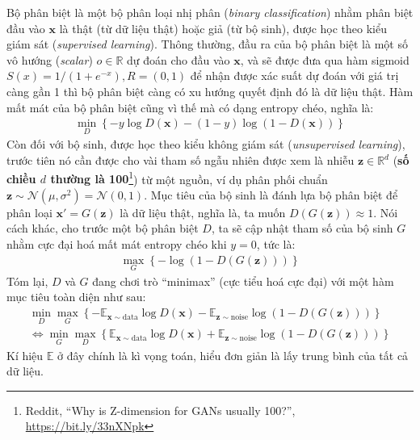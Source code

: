 \documentclass[a4paper]{article}
\begin{document}
\noindent
Bộ phân biệt là một bộ phân loại nhị phân (\textit{binary classification}) nhằm phân biệt đầu vào $\mathbf{x}$ là thật (từ dữ liệu thật) hoặc giả (từ bộ sinh), được học theo kiểu giám sát (\textit{supervised learning}). Thông thường, đầu ra của bộ phân biệt là một số vô hướng (\textit{scalar}) $o \in \mathbb{R}$ dự đoán cho đầu vào $\mathbf{x}$, và sẽ được đưa qua hàm sigmoid $S(x) = 1/(1+e^{-x}), R = (0, 1)$ để nhận được xác suất dự đoán với giá trị càng gần 1 thì bộ phân biệt càng có xu hướng quyết định đó là dữ liệu thật. Hàm mất mát của bộ phân biệt cũng vì thế mà có dạng entropy chéo, nghĩa là:
\begin{align*}
    \min_{D}\left\{-y\log D\left(\mathbf{x}\right) - \left(1-y\right)\log\left(1-D\left(\mathbf{x}\right)\right)\right\}
\end{align*}
Còn đối với bộ sinh, được học theo kiểu không giám sát (\textit{unsupervised learning}), trước tiên nó cần được cho vài tham số ngẫu nhiên được xem là nhiễu $\mathbf{z} \in \mathbb{R}^d$ (\textbf{số chiều $d$ thường là 100}\footnote{Reddit, ``Why is Z-dimension for GANs usually 100?'', \href{https://bit.ly/33nXNpk}{https://bit.ly/33nXNpk}}) từ một nguồn, ví dụ phân phối chuẩn $\mathbf{z} \sim \mathcal{N}\left(\mu, \sigma^2\right)=\mathcal{N}\left(0, 1\right)$. Mục tiêu của bộ sinh là đánh lựa bộ phân biệt để phân loại $\mathbf{x'} = G\left(\mathbf{z}\right)$ là dữ liệu thật, nghĩa là, ta muốn $D\left(G\left(\mathbf{z}\right)\right) \approx 1$. Nói cách khác, cho trước một bộ phân biệt $D$, ta sẽ cập nhật tham số của bộ sinh $G$ nhằm cực đại hoá mất mát entropy chéo khi $y=0$, tức là:
\begin{align*}
    \max_G\left\{-\log\left(1-D\left(G\left(\mathbf{z}\right)\right)\right)\right\}
\end{align*}
Tóm lại, $D$ và $G$ đang chơi trò ``minimax'' (cực tiểu hoá cực đại) với một hàm mục tiêu toàn diện như sau:
\begin{align*}
    \min_D\max_G\left\{-\mathbb{E}_{\mathbf{x}\sim \text{data}}\log D\left(\mathbf{x}\right)-\mathbb{E}_{\mathbf{z} \sim \text{noise}}\log\left(1-D\left(G\left(\mathbf{z}\right)\right)\right)\right\}\\
    \Leftrightarrow \min_G\max_D\left\{\mathbb{E}_{\mathbf{x}\sim \text{data}}\log D\left(\mathbf{x}\right)+\mathbb{E}_{\mathbf{z} \sim \text{noise}}\log\left(1-D\left(G\left(\mathbf{z}\right)\right)\right)\right\}
\end{align*}
Kí hiệu $\mathbb{E}$ ở đây chính là kì vọng toán, hiểu đơn giản là lấy trung bình của tất cả dữ liệu.
\end{document}
